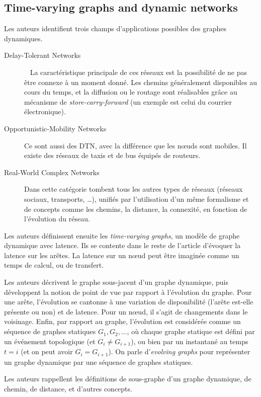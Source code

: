 \documentclass[12pt,a4paper]{article}
\begin{document}
\subsection{Time-varying graphs and dynamic
  networks~\cite{DBLP:journals/paapp/CasteigtsFQS12}}
Les auteurs identifient trois champs d'applications possibles des
graphes dynamiques.
\begin{description}
\item[Delay-Tolerant Networks]~\cite{DBLP:journals/rfc/rfc4838} La
  caractéristique principale de ces réseaux est la possibilité de ne
  pas être connexe à un moment donné. Les chemins généralement
  disponibles au cours du temps, et la diffusion ou le routage sont
  réalisables grâce au mécanisme de \textit{store-carry-forward} (un
  exemple est celui du courrier électronique).
\item[Opportunistic-Mobility Networks] Ce sont aussi des DTN, avec la
  différence que les nœuds sont mobiles. Il existe des réseaux de
  taxis et de bus équipés de routeurs.
\item[Real-World Complex Networks] Dans cette catégorie tombent tous
  les autres types de réseaux (réseaux sociaux, transports, …),
  unifiés par l'utilisation d'un même formalisme et de concepts comme
  les chemins, la distance, la connexité, en fonction de l'évolution
  du réseau.
\end{description}

Les auteurs définissent ensuite les \textit{time-varying graphs}, un
modèle de graphe dynamique avec latence. Ils se contente dans le reste
de l'article d'évoquer la latence sur les arêtes. La latence sur un
nœud peut être imaginée comme un temps de calcul, ou de transfert.

Les auteurs décrivent le graphe sous-jacent d'un graphe dynamique,
puis développent la notion de point de vue par rapport à l'évolution
du graphe. Pour une arête, l'évolution se cantonne à une variation de
disponibilité (l'arête est-elle présente ou non) et de latence. Pour
un nœud, il s'agit de changements dans le voisinage. Enfin, par
rapport au graphe, l'évolution est considérée comme un séquence de
graphes statiques \(G_1, G_2, \dots\), où chaque graphe statique est
défini par un événement topologique (et \(G_i \neq G_{i+1}\)), ou bien
par un instantané au temps \(t = i\) (et on peut avoir
\(G_i = G_{i+1}\)). On parle d'\textit{evolving graphs} pour
représenter un graphe dynamique par une séquence de graphes statiques.

Les auteurs rappellent les définitions de sous-graphe d'un graphe
dynamique, de chemin, de distance, et d'autres concepts.
\end{document}

